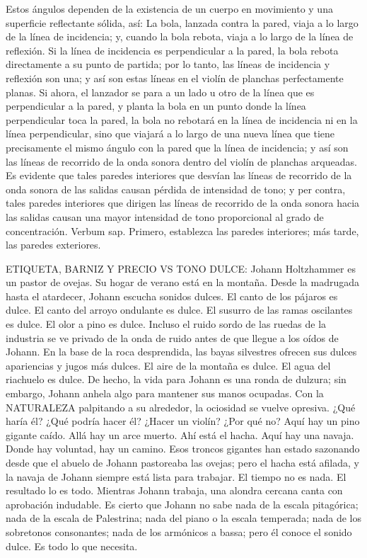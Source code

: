 \documentclass[12pt]{book}
\begin{document}
Estos ángulos dependen de la existencia de un cuerpo en movimiento y una superficie reflectante sólida, así: La bola, lanzada contra la pared, viaja a lo largo de la línea de incidencia; y, cuando la bola rebota, viaja a lo largo de la línea de reflexión. Si la línea de incidencia es perpendicular a la pared, la bola rebota directamente a su punto de partida; por lo tanto, las líneas de incidencia y reflexión son una; y así son estas líneas en el violín de planchas perfectamente planas. Si ahora, el lanzador se para a un lado u otro de la línea que es perpendicular a la pared, y planta la bola en un punto donde la línea perpendicular toca la pared, la bola no rebotará en la línea de incidencia ni en la línea perpendicular, sino que viajará a lo largo de una nueva línea que tiene precisamente el mismo ángulo con la pared que la línea de incidencia; y así son las líneas de recorrido de la onda sonora dentro del violín de planchas arqueadas. Es evidente que tales paredes interiores que desvían las líneas de recorrido de la onda sonora de las salidas causan pérdida de intensidad de tono; y per contra, tales paredes interiores que dirigen las líneas de recorrido de la onda sonora hacia las salidas causan una mayor intensidad de tono proporcional al grado de concentración. Verbum sap. Primero, establezca las paredes interiores; más tarde, las paredes exteriores.

ETIQUETA, BARNIZ Y PRECIO VS TONO DULCE: Johann Holtzhammer es un pastor de ovejas. Su hogar de verano está en la montaña. Desde la madrugada hasta el atardecer, Johann escucha sonidos dulces. El canto de los pájaros es dulce. El canto del arroyo ondulante es dulce. El susurro de las ramas oscilantes es dulce. El olor a pino es dulce. Incluso el ruido sordo de las ruedas de la industria se ve privado de la onda de ruido antes de que llegue a los oídos de Johann. En la base de la roca desprendida, las bayas silvestres ofrecen sus dulces apariencias y jugos más dulces. El aire de la montaña es dulce. El agua del riachuelo es dulce. De hecho, la vida para Johann es una ronda de dulzura; sin embargo, Johann anhela algo para mantener sus manos ocupadas. Con la NATURALEZA palpitando a su alrededor, la ociosidad se vuelve opresiva. ¿Qué haría él? ¿Qué podría hacer él? ¿Hacer un violín? ¿Por qué no? Aquí hay un pino gigante caído. Allá hay un arce muerto. Ahí está el hacha. Aquí hay una navaja. Donde hay voluntad, hay un camino. Esos troncos gigantes han estado sazonando desde que el abuelo de Johann pastoreaba las ovejas; pero el hacha está afilada, y la navaja de Johann siempre está lista para trabajar. El tiempo no es nada. El resultado lo es todo. Mientras Johann trabaja, una alondra cercana canta con aprobación indudable. Es cierto que Johann no sabe nada de la escala pitagórica; nada de la escala de Palestrina; nada del piano o la escala temperada; nada de los sobretonos consonantes; nada de los armónicos a bassa; pero él conoce el sonido dulce. Es todo lo que necesita.
\end{document}
